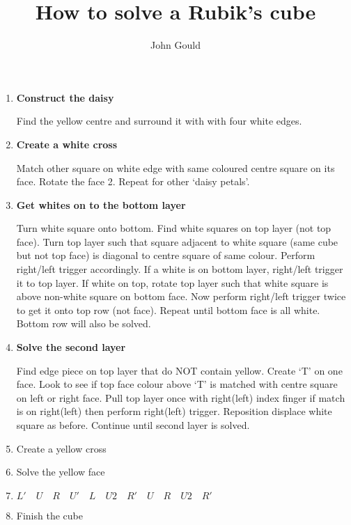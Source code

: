 \documentclass{article}
\title{How to solve a Rubik's cube}
\author{John Gould}
\begin{document}
    \maketitle
    \begin{enumerate}
        \item \textbf{Construct the daisy}

              Find the yellow centre and surround it with with four white edges.
        \item \textbf{Create a white cross}

              Match other square on white edge with same coloured centre square on its face.
              Rotate the face 2. Repeat for other `daisy petals'.
        \item \textbf{Get whites on to the bottom layer}
        
              Turn white square onto bottom. Find white squares on top layer (not top face).
              Turn top layer such that square adjacent to white square (same cube but not top face)
              is diagonal to centre square of same colour. Perform right/left trigger accordingly.
              If a white is on bottom layer, right/left trigger it to top layer. If white on top, rotate
              top layer such that white square is above non-white square on bottom face. Now perform right/left
              trigger twice to get it onto top row (not face). Repeat until bottom face is all white. Bottom 
              row will also be solved.
        \item \textbf{Solve the second layer}

              Find edge piece on top layer that do NOT contain yellow. Create `T' on one face.
              Look to see if top face colour above `T' is matched with centre square on left or right face.
              Pull top layer once with right(left) index finger if match is on right(left) then perform right(left)
              trigger. Reposition displace white square as before. Continue until second layer is solved.

        \item Create a yellow cross
        \item Solve the yellow face
        \item $L'\quad
               U\quad
               R\quad
               U'\quad
               L\quad
               U2\quad
               R'\quad
               U\quad
               R\quad
               U2\quad
               R'$
        \item Finish the cube
    \end{enumerate}
\end{document}
